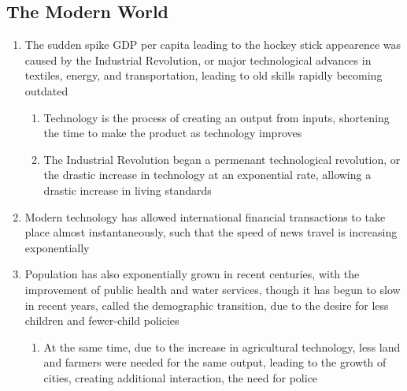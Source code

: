 \documentclass[11 pt, twoside]{article}
\begin{document}
\subsection{The Modern World}
\begin{enumerate}
\item The sudden spike GDP per capita leading to the hockey stick appearence was caused by the Industrial Revolution, or major technological advances in textiles, energy, and transportation, leading to old skills rapidly becoming outdated
\begin{enumerate}
\item Technology is the process of creating an output from inputs, shortening the time to make the product as technology improves
\item The Industrial Revolution began a permenant technological revolution, or the drastic increase in technology at an exponential rate, allowing a drastic increase in living standards
\end{enumerate}
\item Modern technology has allowed international financial transactions to take place almost instantaneously, such that the speed of news travel is increasing exponentially
\item Population has also exponentially grown in recent centuries, with the improvement of public health and water services, though it has begun to slow in recent years, called the demographic transition, due to the desire for less children and fewer-child policies
\begin{enumerate}
\item At the same time, due to the increase in agricultural technology, less land and farmers were needed for the same output, leading to the growth of cities, creating additional interaction, the need for police
\end{enumerate}
\end{enumerate}
\end{document}
